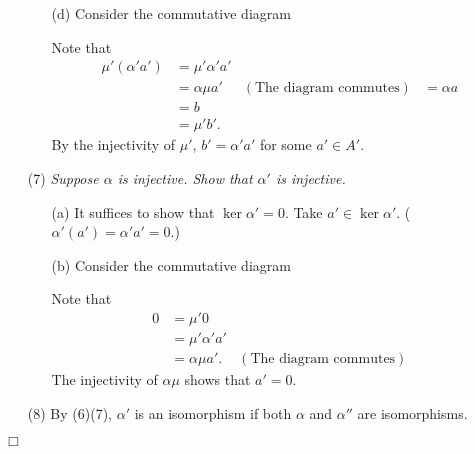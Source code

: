 \documentclass{article}
\begin{document}
\begin{enumerate}
\begin{enumerate}
  \item[(d)]
    Consider the commutative diagram
    \begin{center}
    \end{center}
    Note that
    \begin{align*}
      \mu'(\alpha'a')
      &= \mu' \alpha' a' \\
      &= \alpha \mu a'
        &(\text{The diagram commutes})
      &= \alpha a \\
      &= b \\
      &= \mu' b'.
    \end{align*}
    By the injectivity of $\mu'$, $b' = \alpha' a'$ for some $a' \in A'$.
  \end{enumerate}

\item[(7)]
  \emph{Suppose $\alpha$ is injective.
  Show that $\alpha'$ is injective.}
  \begin{enumerate}
  \item[(a)]
    It suffices to show that $\ker\alpha' = 0$.
    Take $a' \in \ker\alpha'$. ($\alpha'(a') = \alpha' a' = 0$.)

  \item[(b)]
    Consider the commutative diagram
    \begin{center}
    \end{center}
    Note that
    \begin{align*}
      0
      &= \mu' 0 \\
      &= \mu'\alpha' a' \\
      &= \alpha\mu a'.
        &(\text{The diagram commutes})
    \end{align*}
    The injectivity of $\alpha\mu$ shows that $a' = 0$.
  \end{enumerate}

\item[(8)]
  By (6)(7), $\alpha'$ is an isomorphism
  if both $\alpha$ and $\alpha''$ are isomorphisms.
\end{enumerate}
$\Box$ \\\\
\end{document}
